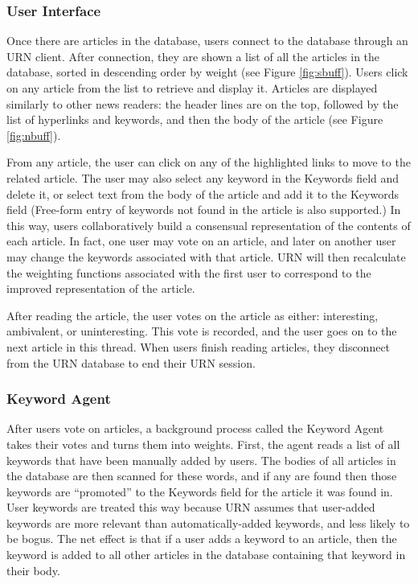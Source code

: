 \subsubsection{User Interface}

Once there are articles in the database, users connect to the database
through an URN client. After connection, they are shown a list of all the
articles in the database, sorted in descending order by weight (see Figure
\ref{fig:sbuff}). Users click on any article from the list to retrieve and
display it. Articles are displayed similarly to other news readers: the
header lines are on the top, followed by the list of hyperlinks and
keywords, and then the body of the article (see Figure \ref{fig:nbuff}).

\begin{figure*}[t]
  {\centerline{}}
  \caption{
  {\em An Article Displayed with URN. Articles are displayed along
  with a field containing a list of keywords representing the
  collaboratively built, consensual representation of the content of this
  article.}}
  \label{fig:nbuff}
\end{figure*}

From any article, the user can click on any of the highlighted links to
move to the related article.  The user may also select any keyword in the
Keywords field and delete it, or select text from the body of the article
and add it to the Keywords field (Free-form entry of keywords not found in
the article is also supported.) In this way, users collaboratively build a
consensual representation of the contents of each article. In fact, one
user may vote on an article, and later on another user may change the
keywords associated with that article.  URN will then recalculate the
weighting functions associated with the first user to correspond to the
improved representation of the article.

After reading the article, the user votes on the article as either:
interesting, ambivalent, or uninteresting. This vote is recorded, and the user
goes on to the next article in this thread. When users finish reading articles,
they disconnect from the URN database to end their URN session.

\subsubsection{Keyword Agent}

After users vote on articles, a background process called the Keyword Agent
takes their votes and turns them into weights. First, the agent reads a
list of all keywords that have been manually added by users. The bodies of
all articles in the database are then scanned for these words, and if any
are found then those keywords are ``promoted'' to the Keywords field for
the article it was found in. User keywords are treated this way because URN
assumes that user-added keywords are more relevant than automatically-added
keywords, and less likely to be bogus. The net effect is that if a user
adds a keyword to an article, then the keyword is added to all other
articles in the database containing that keyword in their body.

